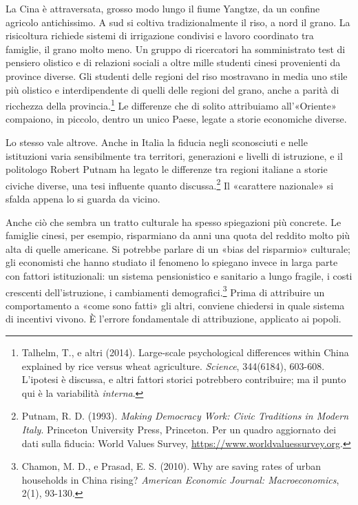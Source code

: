 La Cina è attraversata, grosso modo lungo il fiume Yangtze, da un confine agricolo antichissimo. A sud si coltiva tradizionalmente il riso, a nord il grano. La risicoltura richiede sistemi di irrigazione condivisi e lavoro coordinato tra famiglie, il grano molto meno. Un gruppo di ricercatori ha somministrato test di pensiero olistico e di relazioni sociali a oltre mille studenti cinesi provenienti da province diverse. Gli studenti delle regioni del riso mostravano in media uno stile più olistico e interdipendente di quelli delle regioni del grano, anche a parità di ricchezza della provincia.\footnote{Talhelm, T., e altri (2014). Large-scale psychological differences within China explained by rice versus wheat agriculture. \textit{Science}, 344(6184), 603-608. L'ipotesi è discussa, e altri fattori storici potrebbero contribuire; ma il punto qui è la variabilità \textit{interna}.} Le differenze che di solito attribuiamo all'«Oriente» compaiono, in piccolo, dentro un unico Paese, legate a storie economiche diverse.


Lo stesso vale altrove. Anche in Italia la fiducia negli sconosciuti e nelle istituzioni varia sensibilmente tra territori, generazioni e livelli di istruzione, e il politologo Robert Putnam ha legato le differenze tra regioni italiane a storie civiche diverse, una tesi influente quanto discussa.\footnote{Putnam, R. D. (1993). \textit{Making Democracy Work: Civic Traditions in Modern Italy}. Princeton University Press, Princeton. Per un quadro aggiornato dei dati sulla fiducia: World Values Survey, \url{https://www.worldvaluessurvey.org}.} Il «carattere nazionale» si sfalda appena lo si guarda da vicino.

Anche ciò che sembra un tratto culturale ha spesso spiegazioni più concrete. Le famiglie cinesi, per esempio, risparmiano da anni una quota del reddito molto più alta di quelle americane. Si potrebbe parlare di un «bias del risparmio» culturale; gli economisti che hanno studiato il fenomeno lo spiegano invece in larga parte con fattori istituzionali: un sistema pensionistico e sanitario a lungo fragile, i costi crescenti dell'istruzione, i cambiamenti demografici.\footnote{Chamon, M. D., e Prasad, E. S. (2010). Why are saving rates of urban households in China rising? \textit{American Economic Journal: Macroeconomics}, 2(1), 93-130.} Prima di attribuire un comportamento a «come sono fatti» gli altri, conviene chiedersi in quale sistema di incentivi vivono. È l'errore fondamentale di attribuzione, applicato ai popoli.


